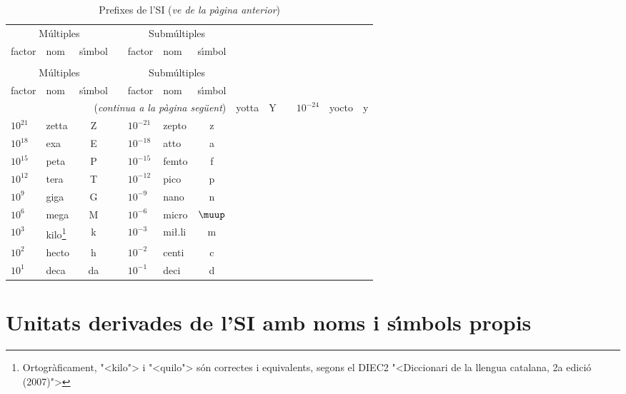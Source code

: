 \begin{longtable}[h]{llccllc}
   \caption{\label{taula:SI-prefixes} Prefixes de  l'SI}\\
   \toprule[1pt]
   \multicolumn{3}{c}{M\'{u}ltiples} & & \multicolumn{3}{c}{Subm\'{u}ltiples}\\
   \cmidrule(rl){1-3} \cmidrule(rl){5-7}
   factor & nom & s\'{\i}mbol & & factor & nom & s\'{\i}mbol\\
   \midrule
   \endfirsthead
   \caption[]{Prefixes de  l'SI (\emph{ve de la p\`{a}gina  anterior})}\\
   \toprule[1pt]
    \multicolumn{3}{c}{M\'{u}ltiples} & & \multicolumn{3}{c}{Subm\'{u}ltiples}\\
   \cmidrule(rl){1-3} \cmidrule(rl){5-7}
   factor & nom & s\'{\i}mbol & & factor & nom & s\'{\i}mbol\\
   \midrule
   \endhead
   \midrule
   \multicolumn{7}{r}{(\emph{continua a la p\`{a}gina seg\"{u}ent})}
   \endfoot
   \endlastfoot
    $10^{24}$ &  yotta & Y & & $10^{-24}$ & yocto & y \\
    $10^{21}$ &  zetta & Z & & $10^{-21}$ & zepto & z \\
    $10^{18}$ &  exa & E & & $10^{-18}$ & atto & a \\
    $10^{15}$ &  peta & P & & $10^{-15}$ & femto & f \\
    $10^{12}$ &  tera & T & & $10^{-12}$ & pico & p \\
    $10^{9}$ &  giga & G & & $10^{-9}$ & nano & n \\
    $10^{6}$ &  mega & M & & $10^{-6}$ & micro & $\micro$ \\
    $10^{3}$ &  kilo\footnote{Ortogr\`{a}ficament, {"<}kilo{">} i  {"<}quilo{">} s\'{o}n correctes i equivalents, segons el DIEC2 {"<}Diccionari de la llengua catalana, 2a edici\'{o} (2007){">}} & k & & $10^{-3}$ & mi{\l.l}i & m \\
    $10^{2}$ &  hecto & h & & $10^{-2}$ & centi & c \\
    $10^{1}$ &  deca & da & & $10^{-1}$ & deci & d \\
   \bottomrule[1pt]
\end{longtable}
      
      
     



\section{Unitats derivades de l'SI amb noms i s\'{\i}mbols propis}

